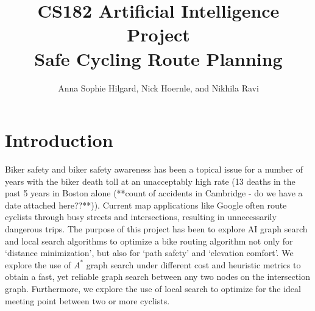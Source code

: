 \documentclass[11pt]{article}
\title{CS182 Artificial Intelligence Project \\ \Large{Safe Cycling Route Planning}}
\author{Anna Sophie Hilgard, Nick Hoernle, and Nikhila Ravi}
\begin{document}
\maketitle{}



\setlength{\parindent}{2em}
\setlength{\parskip}{1em}
\renewcommand{\baselinestretch}{1.3}

\section{Introduction}

Biker safety and biker safety awareness has been a topical issue for a number of years with the biker death toll at an unacceptably high rate (13 deaths in the past 5 years in Boston alone (**count of accidents in Cambridge - do we have a date attached here??**)). Current map applications like Google often route cyclists through busy streets and intersections, resulting in unnecessarily dangerous trips. The purpose of this project has been to explore AI graph search and local search algorithms to optimize a bike routing algorithm not only for `distance minimization', but also for `path safety' and `elevation comfort'. We explore the use of $A^{*}$ graph search under different cost and heuristic metrics to obtain a fast, yet reliable graph search between any two nodes on the intersection graph. Furthermore, we explore the use of local search to optimize for the ideal meeting point between two or more cyclists.


\end{document}
